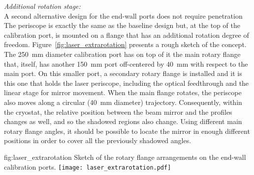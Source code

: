 {\it Additional rotation stage:}\\ 
A second alternative design for the end-wall ports does not require  penetration
The periscope is exactly the same as the baseline design but, at the top of the calibration port, is mounted on a flange that has an additional rotation degree of freedom. Figure~\ref{fig:laser_extrarotation} presents a rough sketch of the concept. The \SI{250}{\milli\m} diameter calibration port has on top of it the main rotary flange that, itself, has another \SI{150}{\milli\m} port off-centered by \SI{40}{\milli\m} with respect to the main port. On this smaller port, a secondary rotary flange is installed and it is this one that holds the laser periscope, including the optical feedthrough and the linear stage for mirror movement. When the main flange rotates, the periscope also moves along a circular (\SI{40}{\milli\m} diameter) trajectory. Consequently, within the cryostat, the relative position between the beam mirror and the  profiles changes as well, and so the shadowed regions also change. Using different main rotary flange angles, it should be possible to locate the mirror in enough different positions in order to cover all the previously shadowed angles.

\begin{dunefigure}{fig:laser_extrarotation}
{Sketch of the rotary flange arrangements on the end-wall calibration ports.}
\texttt{[image: laser\_extrarotation.pdf]}
\end{dunefigure}




